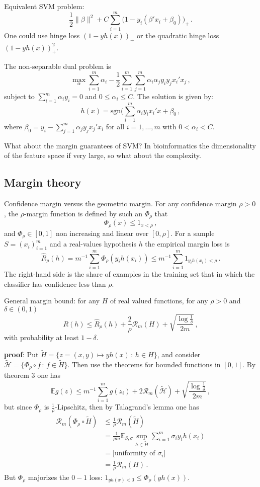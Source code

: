 \documentclass[a4paper]{article}
\newcommand{\ex}{\mathbb{E}}
\begin{document}
Equivalent SVM problem:
\[ \frac{1}{2}\|\beta\|^2 + C \sum_{i=1}^m \bigl(1-y_i(\beta'x_i + \beta_0)\bigr)_+ \,. \]
One could use hinge loss $(1-yh(x))_+$ or the quadratic hinge loss $(1-yh(x))_+^2$.

The non-separable dual problem is
\[\max_\alpha \sum_{i=1}^m \alpha_i - \frac{1}{2}\sum_{i=1}^m \sum_{j=1}^m \alpha_i \alpha_j y_i y_j x_i'x_j \,, \]
subject to $\sum_{i=1}^m \alpha_i y_i = 0$ and $0 \leq \alpha_i \leq C$. The solution
is given by:
\[ h(x) = \text{sgn}(\sum_{i=1}^m \alpha_i y_i x_i'x + \beta_0 \,,\]
where $\beta_0 = y_i - \sum_{j=1}^m \alpha_j y_j x_j'x_i$ for all $i=1,\ldots, m$
with $0 < \alpha_i < C$.

What about the margin guarantees of SVM? In bioinformatics the dimensionality of
the feature space if very large, so what about the complexity.


\subsection{Margin theory} %
\label{sub:margin_theory}
Confidence margin versus the geometric margin. For any confidence margin $\rho>0$,
the $\rho$-margin function is defined by such an $\Phi_\rho$ that
\[ \Phi_\rho(x) \leq 1_{x < \rho} \,,\]
and $\Phi_\rho \in [0,1]$ non increasing and linear over $[0, \rho]$. For a sample
$S = (x_i)_{i=1}^m$ and a real-values hypothesis $h$ the empirical margin loss is
\[\hat{R}_\rho(h)
    = m^{-1} \sum_{i=1}^m \Phi_\rho(y_i h(x_i))
    \leq m^{-1} \sum_{i=1}^m 1_{y_i h(x_i) < \rho}
    \,. \]
The right-hand side is the share of examples in the training set that in which the
classifier has confidence less than $\rho$.

General margin bound: for any $H$ of real valued functions, for any $\rho>0$ and
$\delta\in(0,1)$
\[ R(h)
    \leq \hat{R}_\rho(h) + \frac{2}{\rho} \mathcal{R}_m(H)
    + \sqrt{\frac{\log\frac{1}{\delta}}{2m}}
    \,, \]
with probability at least $1-\delta$.

\textbf{proof}: Put $\tilde{H} = \{z = (x,y) \mapsto yh(x) \,:\, h\in H\}$, and
consider $\tilde{\mathcal{H}} = \{\Phi_\rho \circ f\,:\, f\in \tilde{H}\}$.
Then use the theorems for bounded functions in $[0,1]$.
By theorem 3 one has
\[ \ex g(z) \leq m^{-1} \sum_{i=1}^m g(z_i)
            + 2\mathcal{R}_m(\tilde{\mathcal{H}}) + \sqrt{\frac{\log\frac{1}{\delta}}{2m}}
    \,,\]
but since $\Phi_\rho$ is $\frac{1}{\rho}$-Lipschitz, then by Talagrand's lemma one
has
\begin{align*}
    \mathcal{R}_m(\Phi_\rho\circ \tilde{H})
    &\leq \frac{1}{\rho} \mathcal{R}_m(\tilde{H}) \\
    &= \frac{1}{\rho m} \ex_{S,\sigma} \sup_{h\in \tilde{H}} \sum_{i=1}^m \sigma_i y_i h(x_i) \\
    &=\bigl[\text{uniformity of } \sigma_i \bigr] \\
    &= \frac{1}{\rho} \mathcal{R}_m(H) \,.
\end{align*}
But $\Phi_\rho$ majorizes the $0-1$ loss: $1_{yh(x) < 0} \leq \Phi_\rho(yh(x))$.
\end{document}
